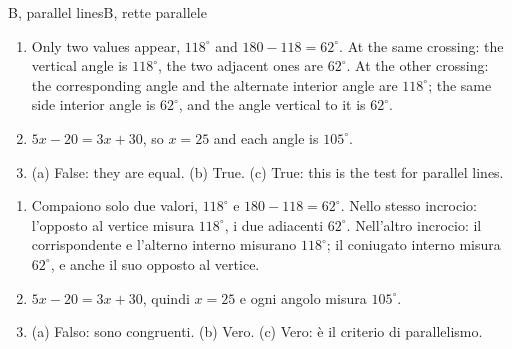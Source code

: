 \begin{solution}{B, parallel lines}{B, rette parallele}
\begin{enumerate}[label=\textbf{B\arabic*.}, leftmargin=2.2em]
\item Only two values appear, $118^\circ$ and $180 - 118 = 62^\circ$. At the same crossing: the vertical angle is $118^\circ$, the two adjacent ones are $62^\circ$. At the other crossing: the corresponding angle and the alternate interior angle are $118^\circ$; the same side interior angle is $62^\circ$, and the angle vertical to it is $62^\circ$.
\item $5x - 20 = 3x + 30$, so $x = 25$ and each angle is $105^\circ$.
\item (a) False: they are equal. (b) True. (c) True: this is the test for parallel lines.
\end{enumerate}
\tcblower
\begin{enumerate}[label=\textbf{B\arabic*.}, leftmargin=2.2em]
\item Compaiono solo due valori, $118^\circ$ e $180 - 118 = 62^\circ$. Nello stesso incrocio: l'opposto al vertice misura $118^\circ$, i due adiacenti $62^\circ$. Nell'altro incrocio: il corrispondente e l'alterno interno misurano $118^\circ$; il coniugato interno misura $62^\circ$, e anche il suo opposto al vertice.
\item $5x - 20 = 3x + 30$, quindi $x = 25$ e ogni angolo misura $105^\circ$.
\item (a) Falso: sono congruenti. (b) Vero. (c) Vero: è il criterio di parallelismo.
\end{enumerate}
\end{solution}

